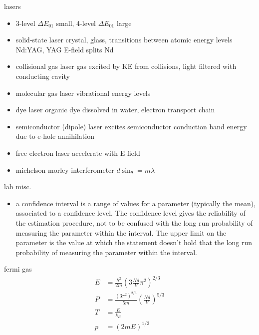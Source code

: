 \documentclass[avery5388, frame, grid]{flashcards}
\begin{document}
\begin{flashcard}{lasers}
  {
    \begin{itemize}
    \item 3-level $\Delta E_{01}$ small, 4-level $\Delta E_{01}$ large
    \item solid-state laser
      \subitem crystal, glass, transitions between atomic energy levels Nd:YAG, YAG E-field splits Nd
    \item collisional gas laser
      \subitem gas excited by KE from collisions, light filtered with conducting cavity
    \item molecular gas laser
      \subitem vibrational energy levels
    \item dye laser
      \subitem organic dye dissolved in water, electron transport chain
    \item semiconductor (dipole) laser
      \subitem excites semiconductor conduction band energy due to e-hole annihilation
    \item free electron laser
      \subitem accelerate with E-field
    \item michelson-morley interferometer $d \sin_{\theta} = m \lambda$
    \end{itemize}
  }
\end{flashcard}

\begin{flashcard}{lab misc.}
  {
    \begin{itemize}
    \item a confidence interval is a range of values for a parameter (typically the mean),
      associated to a confidence level. The confidence level gives the reliability of the estimation
      procedure, not to be confused with the long run probability of measuring the parameter
      within the interval. The upper limit on the parameter is the value
      at which the statement doesn't hold that the long run probability of measuring the parameter
      within the interval.
    \end{itemize}
  }
\end{flashcard}


\begin{flashcard}{fermi gas}
  {
    \begin{align*}
      E &= \frac{\hbar^{2}}{2m}(3 \frac{Nd}{V} \pi^{2})^{2/3}\\
      P &= \frac{(3\pi^{2})^{2/3}}{5m}(\frac{Nd}{V})^{5/3}\\
      T &= \frac{E}{k_{B}}\\
      p &= (2mE)^{1/2}
    \end{align*}
  }
\end{flashcard}
\end{document}
